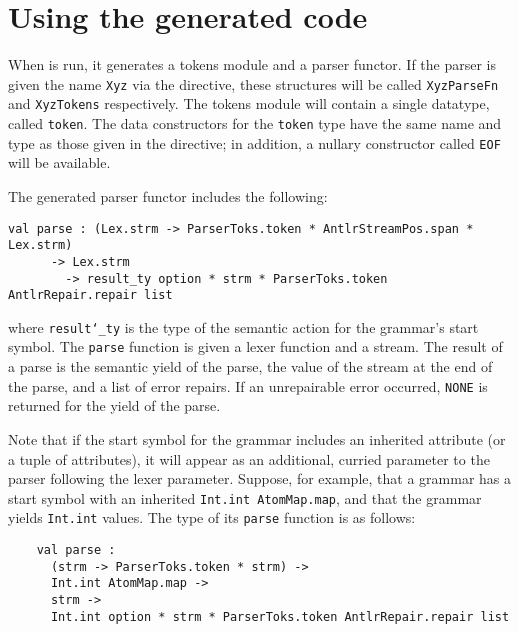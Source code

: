 
\section{Using the generated code}\label{sec:antlr-gencode}

When \antlr{} is run, it generates a tokens module and a parser functor.
If the parser is given the name \texttt{Xyz} via the  directive, these structures will be called \texttt{XyzParseFn} and \texttt{XyzTokens} respectively.  
The tokens module will contain a single datatype, called \texttt{token}.  The data constructors for the \texttt{token} type have the same name and type as those given in the  directive; in addition, a nullary constructor called \texttt{EOF} will be available.

The generated parser functor includes the following:
\begin{lstlisting}
val parse : (Lex.strm -> ParserToks.token * AntlrStreamPos.span * Lex.strm)
      -> Lex.strm
        -> result_ty option * strm * ParserToks.token AntlrRepair.repair list
\end{lstlisting}
where \texttt{result\char`\_ty} is the type of the semantic action for the grammar's start symbol.  
The \texttt{parse} function is given a lexer function and a stream.
The result of a parse is the semantic yield of the parse, the value of the stream at the end of the parse, and a list of error repairs.  
If an unrepairable error occurred, \texttt{NONE} is returned for the yield of the parse.

Note that if the start symbol for the grammar includes an inherited attribute (or a tuple of attributes), it will appear as an additional, curried parameter to the parser following the lexer parameter.  Suppose, for example, that a grammar has a start symbol with an inherited \texttt{Int.int AtomMap.map}, and that the grammar yields \texttt{Int.int} values.  The type of its \texttt{parse} function is as follows:
\begin{lstlisting}
    val parse : 
      (strm -> ParserToks.token * strm) -> 
      Int.int AtomMap.map -> 
      strm -> 
      Int.int option * strm * ParserToks.token AntlrRepair.repair list
\end{lstlisting}


